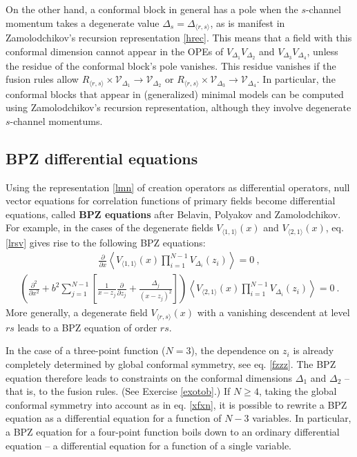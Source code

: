 \documentclass[12pt, a4paper, notitlepage, twoside]{report}
\numberwithin{equation}{section}
\theoremstyle{break}
\begin{document}
On the other hand, a conformal block in general has a pole when the $s$-channel momentum takes a degenerate value $\Delta_s=\Delta_{\langle r,s\rangle}$, as is manifest in Zamolodchikov's recursion representation \eqref{hrec}.
This means that a field with this conformal dimension cannot appear in the OPEs of $V_{\Delta_1}V_{\Delta_2}$ and $V_{\Delta_3}V_{\Delta_4}$, unless the residue of the conformal block's pole vanishes. 
This residue vanishes if the fusion rules allow $R_{\langle r,s \rangle}\times \mathcal{V}_{\Delta_1}\to \mathcal{V}_{\Delta_2}$ or $R_{\langle r,s \rangle}\times \mathcal{V}_{\Delta_3}\to \mathcal{V}_{\Delta_4}$.
In particular, the conformal blocks that appear in (generalized) minimal models can be computed using Zamolodchikov's recursion representation, although they involve degenerate $s$-channel momentums. 


\subsection{BPZ differential equations \label{secbpz}}

Using the representation \eqref{lmn} of creation operators as differential operators, null vector equations for correlation functions of primary fields become differential equations, called \textbf{\boldmath BPZ equations} after Belavin, Polyakov and Zamolodchikov. 
For example, in the cases of the degenerate fields $V_{\langle 1,1 \rangle}(x)$ and $V_{\langle 2,1 \rangle}(x)$, eq. \eqref{lrsv} gives rise to the following BPZ equations: 
\begin{align}
 {\frac{\partial}{\partial x}} \left\langle V_{\langle 1,1 \rangle}(x) \prod_{i=1}^{N-1} V_{\Delta_i}(z_i) \right\rangle = 0 \ ,
\label{pvoo} 
\end{align}
\begin{align}
\boxed{\left( \frac{\partial^2}{\partial x^2}  +b^2 \sum_{j=1}^{N-1} \left[\frac{1}{x-z_j}{\frac{\partial}{\partial z_j}}+ \frac{\Delta_j}{(x-z_j)^2} \right]\right)\left\langle V_{\langle 2,1 \rangle}(x) \prod_{i=1}^{N-1} V_{\Delta_i}(z_i) \right\rangle = 0} \ .
\label{pvot}
\end{align}
More generally, a degenerate field $V_{\langle r,s \rangle}(x)$ with a vanishing descendent at level $rs$ leads to a BPZ equation of order $rs$. 

In the case of a three-point function ($N=3$), the dependence on $z_i$ is already completely determined by global conformal symmetry, see eq. \eqref{fzzz}.
The BPZ equation therefore leads to constraints on the conformal dimensions $\Delta_1$ and $\Delta_2$ -- that is, to the fusion rules. (See Exercise \ref{exotob}.) If $N\geq 4$, taking the global conformal symmetry into account as in eq. \eqref{xfxn}, it is possible to rewrite a BPZ equation as a differential equation for a function of $N-3$ variables.
In particular, a BPZ equation for a four-point function boils down to an ordinary differential equation -- a differential equation for a function of a single variable.  
\end{document}
